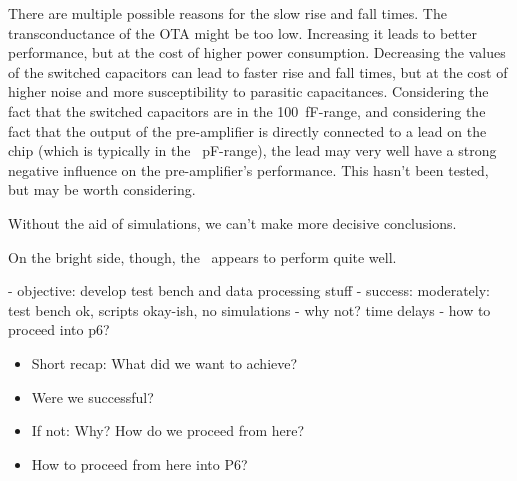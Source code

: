 There  are  multiple possible reasons for the slow rise and  fall  times.  The
transconductance of the OTA might  be  too  low. Increasing it leads to better
performance,  but  at  the  cost  of  higher power consumption. Decreasing the
values of the switched capacitors can lead to faster rise and fall times,  but
at the cost of higher noise and more susceptibility to parasitic capacitances.
Considering   the   fact   that   the   switched   capacitors   are   in   the
\SI{100}{\femto\farad}-range, and considering  the fact that the output of the
pre-amplifier is directly connected  to a lead on the chip (which is typically
in  the  \SI{}{\pico\farad}-range),  the  lead  may  very  well  have a strong
negative influence  on  the  pre-amplifier's  performance.  This  hasn't  been
tested, but may be worth considering.

Without the aid of simulations, we can't make more decisive conclusions.

On the bright side, though, the \sdm~appears to perform quite well.

- objective: develop test bench and data processing stuff
- success: moderately: test bench ok, scripts okay-ish, no simulations
- why not? time delays
- how to proceed into p6?


\begin{itemize}\tightlist
    \item
        Short recap: What did we want to achieve?
    \item
        Were we successful?
    \item
        If not: Why? How do we proceed from here?
    \item
        How to proceed from here into P6?
\end{itemize}
